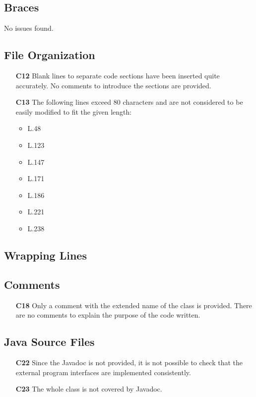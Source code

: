 \subsection{Braces}
No issues found.

\subsection{File Organization}
	\begin{itemize}
		\item[\textbf{C12}] Blank lines to separate code sections have been inserted quite accurately. No comments to introduce the sections are provided.
		\item[\textbf{C13}] The following lines exceed 80 characters and are not considered to be easily modified to fit the given length:
		\begin{itemize}
			\item L.48
			\item L.123
			\item L.147
			\item L.171
			\item L.186
			\item L.221
			\item L.238
		\end{itemize}
	\end{itemize}

\subsection{Wrapping Lines}
\blindtext

\subsection{Comments}
	\begin{itemize}
		\item[\textbf{C18}] Only a comment with the extended name of the class is provided. There are no comments to explain the purpose of the code written.
	\end{itemize}

\subsection{Java Source Files}
	\begin{itemize}
		\item[\textbf{C22}] Since the Javadoc is not provided, it is not possible to check that the external program interfaces are implemented consistently.
		\item[\textbf{C23}] The whole class is not covered by Javadoc.
	\end{itemize}

